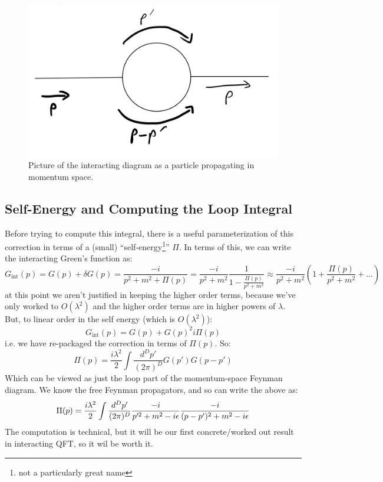 \begin{figure}[htbp]
    \centering
    \includegraphics[scale=0.3]{Lectures/Figures/interactingprop-momentum.png}
    \caption{Picture of the interacting diagram as a particle propagating in momentum space.}
    \label{fig:interactingprop-momentum}
\end{figure}

\subsection{Self-Energy and Computing the Loop Integral}
Before trying to compute this integral, there is a useful parameterization of this correction in terms of a (small) ``self-energy\footnote{not a particularly great name}'' $\Pi$. In terms of this, we can write the interacting Green's function as:
\begin{equation}
    G_{\text{int}}(p) = G(p) + \delta G(p) = \frac{-i}{p^2 + m^2 + \Pi(p)} = \frac{-i}{p^2 + m^2}\frac{1}{1 - \frac{\Pi(p)}{p^2 + m^2}} \approx \frac{-i}{p^2 + m^2}\left(1 + \frac{\Pi(p)}{p^2 + m^2} + \ldots \right)
\end{equation}
at this point we aren't justified in keeping the higher order terms, because we've only worked to $O(\lambda^2)$ and the higher order terms are in higher powers of $\lambda$. But, to linear order in the self energy (which is $O(\lambda^2)$):
\begin{equation}
    G_{\text{int}}(p) = G(p) + G(p)^2 i\Pi(p)
\end{equation}
i.e. we have re-packaged the correction in terms of $\Pi(p)$. So:
\begin{equation}
    \Pi(p) = \frac{i\lambda^2}{2}\int \frac{d^Dp'}{(2\pi)^D}G(p')G(p - p')
\end{equation}
Which can be viewed as just the loop part of the momentum-space Feynman diagram. We know the free Feynman propagators, and so can write the above as:
\begin{equation}
    \Pi(p) = \frac{i\lambda^2}{2}\int \frac{d^Dp'}{(2\pi)^D}\frac{-i}{p'^2 + m^2 - i\epsilon}\frac{-i}{(p - p')^2 + m^2 - i\epsilon}
\end{equation}
The computation is technical, but it will be our first concrete/worked out result in interacting QFT, so it wil be worth it.


